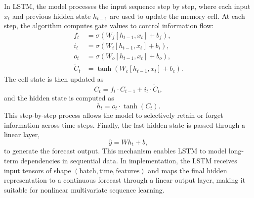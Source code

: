 \documentclass[pdflatex,sn-mathphys-num]{sn-jnl}%
\theoremstyle{thmstyleone}%
\theoremstyle{thmstyletwo}%
\theoremstyle{thmstylethree}%
\begin{document}
In LSTM, the model processes the input sequence step by step, where each input $x_t$ and previous hidden state $h_{t-1}$ are used to update the memory cell. At each step, the algorithm computes gate values to control information flow:
\begin{align}
 f_t &= \sigma\left(W_f[h_{t-1}, x_t] + b_f\right), \nonumber \\
 i_t &= \sigma\left(W_i[h_{t-1}, x_t] + b_i\right), \nonumber \\
 o_t &= \sigma\left(W_o[h_{t-1}, x_t] + b_o\right), \nonumber \\
 \tilde{C}_t &= \tanh\left(W_c[h_{t-1}, x_t] + b_c\right).
\label{eq:lstm_gates}
\end{align}
The cell state is then updated as
\begin{equation}
 C_t = f_t \cdot C_{t-1} + i_t \cdot \tilde{C}_t,
\label{eq:lstm_cell}
\end{equation}
and the hidden state is computed as
\begin{equation}
 h_t = o_t \cdot \tanh(C_t).
\label{eq:lstm_hidden}
\end{equation}
This step-by-step process allows the model to selectively retain or forget information across time steps. Finally, the last hidden state is passed through a linear layer,
\begin{equation}
 \hat{y} = W h_t + b,
\label{eq:lstm_output}
\end{equation}
to generate the forecast output. This mechanism enables LSTM to model long-term dependencies in sequential data. In implementation, the LSTM receives input tensors of shape $(\text{batch}, \text{time}, \text{features})$ and maps the final hidden representation to a continuous forecast through a linear output layer, making it suitable for nonlinear multivariate sequence learning.
\end{document}
